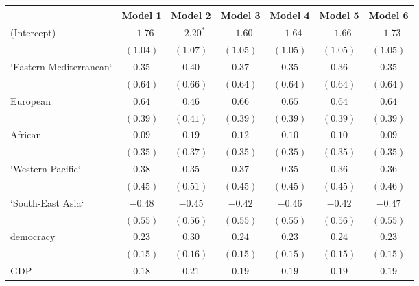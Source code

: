 
\begin{table}[!h]
\begin{center}
\begin{tabular}{l c c c c c c }
\toprule
 & Model 1 & Model 2 & Model 3 & Model 4 & Model 5 & Model 6 \\
\midrule
(Intercept)             & $-1.76$      & $-2.20^{*}$  & $-1.60$      & $-1.64$      & $-1.66$      & $-1.73$      \\
                        & $(1.04)$     & $(1.07)$     & $(1.05)$     & $(1.05)$     & $(1.05)$     & $(1.05)$     \\
`Eastern Mediterranean` & $0.35$       & $0.40$       & $0.37$       & $0.35$       & $0.36$       & $0.35$       \\
                        & $(0.64)$     & $(0.66)$     & $(0.64)$     & $(0.64)$     & $(0.64)$     & $(0.64)$     \\
European                & $0.64$       & $0.46$       & $0.66$       & $0.65$       & $0.64$       & $0.64$       \\
                        & $(0.39)$     & $(0.41)$     & $(0.39)$     & $(0.39)$     & $(0.39)$     & $(0.39)$     \\
African                 & $0.09$       & $0.19$       & $0.12$       & $0.10$       & $0.10$       & $0.09$       \\
                        & $(0.35)$     & $(0.37)$     & $(0.35)$     & $(0.35)$     & $(0.35)$     & $(0.35)$     \\
`Western Pacific`       & $0.38$       & $0.35$       & $0.37$       & $0.35$       & $0.36$       & $0.36$       \\
                        & $(0.45)$     & $(0.51)$     & $(0.45)$     & $(0.45)$     & $(0.45)$     & $(0.46)$     \\
`South-East Asia`       & $-0.48$      & $-0.45$      & $-0.42$      & $-0.46$      & $-0.42$      & $-0.47$      \\
                        & $(0.55)$     & $(0.56)$     & $(0.55)$     & $(0.55)$     & $(0.56)$     & $(0.55)$     \\
democracy               & $0.23$       & $0.30$       & $0.24$       & $0.23$       & $0.24$       & $0.23$       \\
                        & $(0.15)$     & $(0.16)$     & $(0.15)$     & $(0.15)$     & $(0.15)$     & $(0.15)$     \\
GDP                     & $0.18$       & $0.21$       & $0.19$       & $0.19$       & $0.19$       & $0.19$       \\

\end{tabular}
\end{center}
\end{table}
